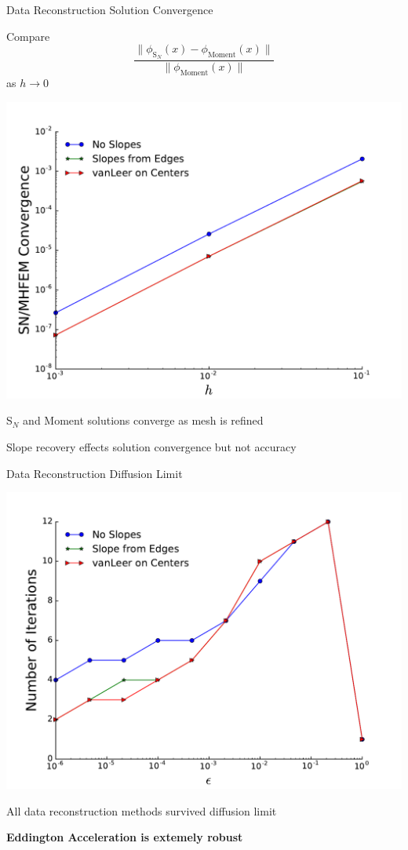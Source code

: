 \documentclass[10pt]{beamer}
\newcommand{\SN}{S$_N$\xspace}
\begin{document}
\begin{frame}{Data Reconstruction Solution Convergence}

	Compare 
	\begin{equation*}
		\frac{\| \phi_{\text{S}_N}(x) - 
			\phi_\text{Moment}(x)\|}{\|\phi_\text{Moment}(x) \|}
	\end{equation*}
	as $h\rightarrow 0$ 

	\pause
	\centerline{\includegraphics[width=.5\paperwidth]{figs/hlim.pdf}}

	\pause
	\SN and Moment solutions converge as mesh is refined 

	\pause Slope recovery effects solution convergence but not accuracy 

\end{frame}

\begin{frame}{Data Reconstruction Diffusion Limit}

	\centerline{\includegraphics[width=.6\paperwidth]{figs/perm_dl.pdf}}

	\pause
	All data reconstruction methods survived diffusion limit

	\pause
	\vfill
	\centerline{\textbf{Eddington Acceleration is extemely robust}}

\end{frame}
\end{document}
